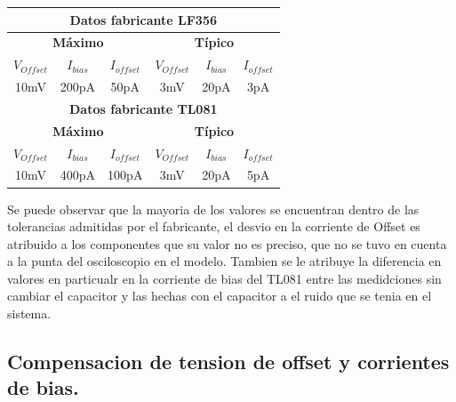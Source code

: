 \documentclass[a4paper]{article}
\begin{document}
\begin{table}[H]
\begin{center}
\begin{tabular}{|c|c|c|c|c|c|}
\hline
\multicolumn{6}{|c|}{\textbf{Datos fabricante LF356}}                                                                                     \\ \hline
\multicolumn{3}{|c|}{\textbf{Máximo}}                               & \multicolumn{3}{c|}{\textbf{Típico}}                                \\ \hline
\textbf{$V_{Offset}$} & \textbf{$I_{bias}$} & \textbf{$I_{offset}$} & \textbf{$V_{Offset}$} & \textbf{$I_{bias}$} & \textbf{$I_{offset}$} \\ \hline
10mV                  & 200pA               & 50pA                  & 3mV                   & 20pA                & 3pA                   \\ \hline
\multicolumn{6}{|c|}{\textbf{Datos fabricante TL081}}                                                                                     \\ \hline
\multicolumn{3}{|c|}{\textbf{Máximo}}                               & \multicolumn{3}{c|}{\textbf{Típico}}                                \\ \hline
\textbf{$V_{Offset}$} & \textbf{$I_{bias}$} & \textbf{$I_{offset}$} & \textbf{$V_{Offset}$} & \textbf{$I_{bias}$} & \textbf{$I_{offset}$} \\ \hline
10mV                  & 400pA               & 100pA                 & 3mV                   & 20pA                & 5pA                   \\ \hline
\end{tabular}
\end{center}
\end{table}
Se puede observar que la mayoria de los valores se encuentran dentro de las tolerancias admitidas por el fabricante, el desvio en la corriente de Offset es atribuido a los componentes que su valor no es preciso, que no se tuvo en cuenta a la punta del osciloscopio en el modelo.
Tambien se le atribuye la diferencia en valores en particualr en la corriente  de bias del TL081 entre las medidciones sin cambiar el capacitor y las hechas con el capacitor a el ruido que se tenia en el sistema.
\subsection{Compensacion de tension de offset y corrientes de bias.}
\end{document}
